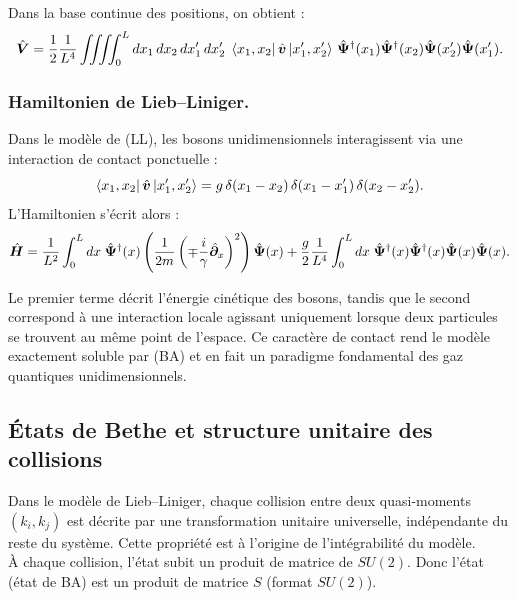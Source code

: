 Dans la base continue des positions, on obtient :
\begin{equation}
	\hat{\bm{V}}
	=
	\frac{1}{2}\frac{1}{L^4}
	\iiiint_0^L dx_1\,dx_2\,dx_1'\,dx_2'\;
	\bra{x_1,x_2}\hat{\bm{v}}\ket{x_1',x_2'}\,
	\hat{\bm{\Psi}}^\dagger(x_1)
	\hat{\bm{\Psi}}^\dagger(x_2)
	\hat{\bm{\Psi}}(x_2')
	\hat{\bm{\Psi}}(x_1').
\end{equation}

\subsubsection{Hamiltonien de Lieb--Liniger.}

Dans le modèle de (\gls{LL}), les bosons unidimensionnels interagissent via une interaction de contact ponctuelle :
\begin{equation}
	\bra{x_1,x_2}\hat{\bm{v}}\ket{x_1',x_2'}
	=
	g\,\delta(x_1-x_2)\,\delta(x_1-x_1')\,\delta(x_2-x_2').
\end{equation}
L’Hamiltonien s’écrit alors :
\begin{equation}
	\hat{\bm{H}}
	=
	\frac{1}{L^2}\int_0^L dx\;
	\hat{\bm{\Psi}}^\dagger(x)
	\left(
		\frac{1}{2m} \left ( \mp \frac{i}\gamma \hat{\bm{\partial}}_x \right ) ^2
	\right)
	\hat{\bm{\Psi}}(x)
	+
	\frac{g}{2}\frac{1}{L^4}
	\int_0^L dx\;
	\hat{\bm{\Psi}}^\dagger(x)
	\hat{\bm{\Psi}}^\dagger(x)
	\hat{\bm{\Psi}}(x)
	\hat{\bm{\Psi}}(x).
\end{equation}

Le premier terme décrit l’énergie cinétique des bosons, tandis que le second correspond à une interaction locale agissant uniquement lorsque deux particules se trouvent au même point de l’espace. Ce caractère de contact rend le modèle exactement soluble par (\gls{BA}) et en fait un paradigme fondamental des gaz quantiques unidimensionnels.


\subsection{États de Bethe et structure unitaire des collisions}

Dans le modèle de Lieb--Liniger, chaque collision entre deux quasi-moments $(k_i,k_j)$ est décrite par une transformation unitaire universelle, indépendante du reste du système. Cette propriété est à l’origine de l’intégrabilité du modèle.\\

À chaque collision, l'état subit un produit de matrice de $SU(2)$.  Donc l'état (état de \gls{BA}) est un produit de matrice $S$ (format $SU(2)$).

